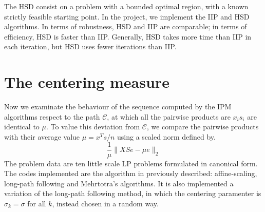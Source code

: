 \documentclass[a4paper,10 pt,titlepage,twoside]{book}
\theoremstyle{plain}
\theoremstyle{definition}
\theoremstyle{remark}
\begin{document}
The HSD consist on a problem with a bounded optimal
region, with a known strictly feasible starting point.
In the project, we implement the IIP and HSD algorithms. In terms of robustness, HSD and IIP are comparable; in terms of
efficiency, HSD is faster than IIP. Generally, HSD takes more time than IIP in
each iteration, but HSD uses fewer iterations than IIP.




\section*{The centering measure}
Now we examinate the behaviour of the sequence computed by the IPM algorithms respect to the path $\mathcal{C}$, at which all the pairwise products are $x_{i}s_{i}$ are identical to $\mu$. To value this deviation from $\mathcal{C}$, we compare the pairwise products with their average value $\mu = x^{T}s/n$ using a scaled norm defined by. 
\begin{equation}
\frac{1}{\mu}\lVert XSe - \mu e \rVert_{2}
\end{equation}
The problem data are ten little scale LP problems formulated in canonical form. The codes implemented are the algorithm in previously described: affine-scaling, long-path following and Mehrtotra's algorithms. It is also implemented a variation of the long-path following method, in which the centering paramenter is $\sigma_{k}=\sigma$ for all $k$, instead chosen in a random way.
\newpage
\end{document}

